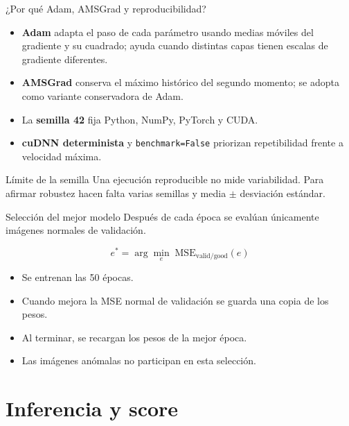 \documentclass[10pt,aspectratio=169]{beamer}
\begin{document}
\begin{frame}{¿Por qué Adam, AMSGrad y reproducibilidad?}
  \begin{itemize}
    \item \textbf{Adam} adapta el paso de cada parámetro usando medias móviles del
          gradiente y su cuadrado; ayuda cuando distintas capas tienen escalas
          de gradiente diferentes.
    \item \textbf{AMSGrad} conserva el máximo histórico del segundo momento; se
          adopta como variante conservadora de Adam.
    \item La \textbf{semilla 42} fija Python, NumPy, PyTorch y CUDA.
    \item \textbf{cuDNN determinista} y \texttt{benchmark=False} priorizan
          repetibilidad frente a velocidad máxima.
  \end{itemize}

  \begin{alertblock}{Límite de la semilla}
    Una ejecución reproducible no mide variabilidad. Para afirmar robustez hacen
    falta varias semillas y media $\pm$ desviación estándar.
  \end{alertblock}
\end{frame}

\begin{frame}{Selección del mejor modelo}
  Después de cada época se evalúan únicamente imágenes normales de validación.

  \[
    e^*=\arg\min_e\;\mathrm{MSE}_{\mathrm{valid/good}}(e)
  \]

  \begin{itemize}
    \item Se entrenan las 50 épocas.
    \item Cuando mejora la MSE normal de validación se guarda una copia de los pesos.
    \item Al terminar, se recargan los pesos de la mejor época.
    \item Las imágenes anómalas no participan en esta selección.
  \end{itemize}
\end{frame}

\section{Inferencia y score}
\end{document}
